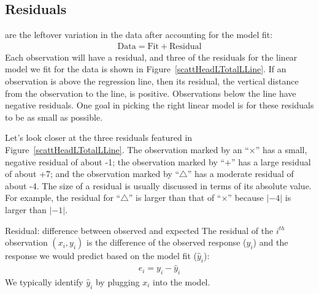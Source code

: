 \subsection{Residuals}


\noindent%
 are the leftover variation in the data after accounting for the model fit:
\begin{align*}
\text{Data} = \text{Fit} + \text{Residual}
\end{align*}
Each observation will have a residual, and three of the
residuals for the linear model we fit for the 
data is shown in
Figure~\ref{scattHeadLTotalLLine}.
If an observation is above the regression line, then its residual,
the vertical distance from the observation to the line, is positive.
Observations below the line have negative residuals.
One goal in picking the right linear model is for these residuals
to be as small as possible.


Let's look closer at the three residuals featured in
Figure~\ref{scattHeadLTotalLLine}.
The observation marked by an ``$\times$'' has a small,
negative residual of about -1;
the observation marked by ``$+$'' has a large residual of about +7;
and the observation marked by ``$\triangle$'' has a moderate
residual of about -4.
The size of a residual is usually discussed in terms of its
absolute value.
For example, the residual for ``$\triangle$'' is larger than
that of ``$\times$'' because $|-4|$ is larger than $|-1|$.

\begin{onebox}{Residual: difference between observed and expected}
The residual of the $i^{th}$ observation $(x_i, y_i)$ is the difference of the observed response ($y_i$) and the response we would predict based on the model fit ($\hat{y}_i$):
\begin{eqnarray*}
e_i = y_i - \hat{y}_i
\end{eqnarray*}
We typically identify $\hat{y}_i$ by plugging $x_i$ into the model.
\end{onebox}

